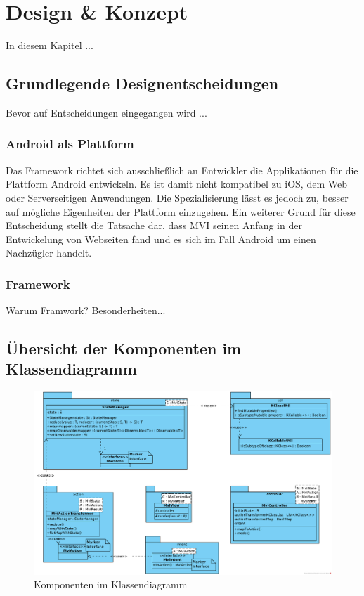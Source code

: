 \section{Design \& Konzept}
\label{sec:design-und-konzept}
In diesem Kapitel ...

\subsection{Grundlegende Designentscheidungen}
Bevor auf Entscheidungen eingegangen wird ...

\subsubsection{Android als Plattform}
Das Framework richtet sich ausschließlich an Entwickler die Applikationen für die Plattform Android entwickeln. Es ist damit nicht kompatibel zu iOS, dem Web oder Serverseitigen Anwendungen. Die Spezialisierung lässt es jedoch zu, besser auf mögliche Eigenheiten der Plattform einzugehen. Ein weiterer Grund für diese Entscheidung stellt die Tatsache dar, dass MVI seinen Anfang in der Entwickelung von Webseiten fand und es sich im Fall Android um einen Nachzügler handelt.

\subsubsection{Framework}
Warum Framwork? Besonderheiten...
\subsection{Übersicht der Komponenten im Klassendiagramm}
\begin{figure}
		\includegraphics[width=\textwidth]{./images/framework-class-diagram}
		\caption{Komponenten im Klassendiagramm}
\end{figure}
\clearpage
